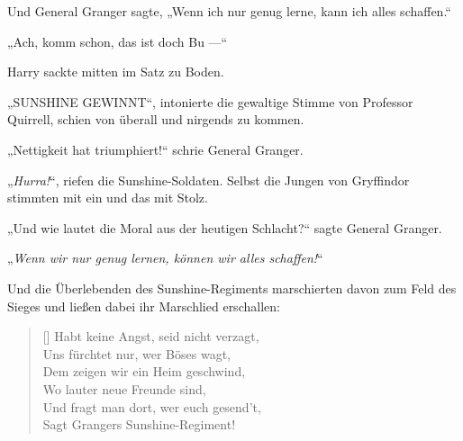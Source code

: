 Und General Granger sagte,
„Wenn ich nur genug lerne, kann ich alles schaffen.“

„Ach, komm schon, das ist doch Bu —“


Harry sackte mitten im Satz zu Boden.

„SUNSHINE GEWINNT“, intonierte die gewaltige Stimme von Professor Quirrell, schien von überall und nirgends zu kommen.

„Nettigkeit hat triumphiert!“ schrie General Granger.

„\emph{Hurra!}“, riefen die Sunshine-Soldaten. Selbst die Jungen von Gryffindor stimmten mit ein und das mit Stolz.

„Und wie lautet die Moral aus der heutigen Schlacht?“ sagte General Granger.

„\emph{Wenn wir nur genug lernen, können wir alles schaffen!}“

Und die Überlebenden des Sunshine-Regiments marschierten davon zum Feld des Sieges und ließen dabei ihr Marschlied erschallen:

\baselineskip\settowidth{\versewidth}{Und fragt man dort, wer euch gesend’t,}
\begin{verse}[\versewidth]
Habt keine Angst, seid nicht verzagt,\\
Uns fürchtet nur, wer Böses wagt,\\
Dem zeigen wir ein Heim geschwind,\\
Wo lauter neue Freunde sind,\\
Und fragt man dort, wer euch gesend’t,\\
Sagt Grangers Sunshine-Regiment!
\end{verse}

